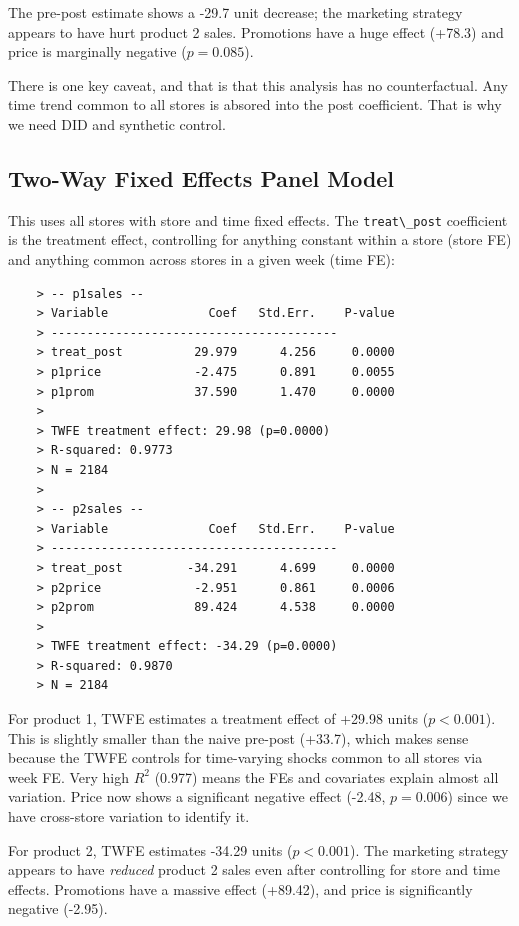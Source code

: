 \documentclass[10pt]{article}
\begin{document}
The pre-post estimate shows a -29.7 unit decrease; the marketing strategy appears to have hurt product 2 sales. Promotions have a huge effect (+78.3) and price is marginally negative ($p = 0.085$). 

There is one key caveat, and that is that this analysis has no counterfactual. Any time trend common to all stores is absored into the post coefficient. That is why we need DID and synthetic control.
\newpage 
\subsection{Two-Way Fixed Effects Panel Model}
This uses all stores with store and time fixed effects. The \verb|treat\_post| coefficient is the treatment effect, controlling for anything constant within a store (store FE) and anything common across stores in a given week (time FE):
\begin{verbatim}
    > -- p1sales --
    > Variable              Coef   Std.Err.    P-value
    > ----------------------------------------
    > treat_post          29.979      4.256     0.0000
    > p1price             -2.475      0.891     0.0055
    > p1prom              37.590      1.470     0.0000
    > 
    > TWFE treatment effect: 29.98 (p=0.0000)
    > R-squared: 0.9773
    > N = 2184
    > 
    > -- p2sales --
    > Variable              Coef   Std.Err.    P-value
    > ----------------------------------------
    > treat_post         -34.291      4.699     0.0000
    > p2price             -2.951      0.861     0.0006
    > p2prom              89.424      4.538     0.0000
    > 
    > TWFE treatment effect: -34.29 (p=0.0000)
    > R-squared: 0.9870
    > N = 2184
\end{verbatim}

For product 1, TWFE estimates a treatment effect of +29.98 units ($p< 0.001 $). This is slightly smaller than the naive pre-post (+33.7), which makes sense because the TWFE controls for time-varying shocks common to all stores via week FE. Very high $R^2 $ (0.977) means the FEs and covariates explain almost all variation. Price now shows a significant negative effect (-2.48, $p=0.006 $) since we have cross-store variation to identify it. 

For product 2, TWFE estimates -34.29 units ($p< 0.001 $). The marketing strategy appears to have \textit{reduced} product 2 sales even after controlling for store and time effects. Promotions have a massive effect (+89.42), and price is significantly negative (-2.95). 
\end{document}
